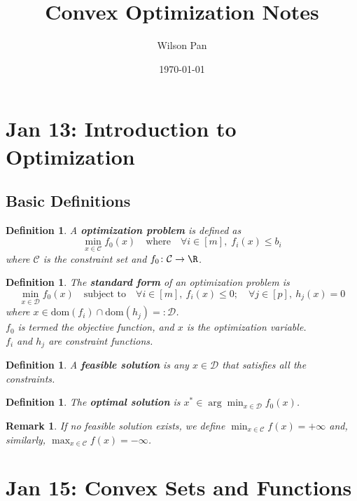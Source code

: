 \documentclass[a4paper]{article}
\title{Convex Optimization Notes}
\author{Wilson Pan}
\date{\today}
\newtheorem{defn}[thm]{Definition}
\newtheorem{rmk}[thm]{Remark}
\begin{document}
\maketitle
\tableofcontents
\newpage

\section{Jan 13: Introduction to Optimization}

\subsection{Basic Definitions}
\begin{defn}
    A \textbf{optimization problem} is defined as
    \[
        \min_{x \in \mathcal{C}} f_0(x) \quad \text{where} \quad \forall i \in [m],\; f_i(x) \leq b_i
    \]
    where $\mathcal{C}$ is the constraint set and $f_0\colon \mathcal{C} \to \R$.
\end{defn}

\begin{defn}
    The \textbf{standard form} of an optimization problem is
    \[
        \min_{x \in \mathcal{D}} f_0(x) \quad \text{subject to} \quad
        \forall i \in [m],\ f_i(x) \leq 0; \quad \forall j \in [p],\ h_j(x) = 0
    \]
    where $x \in \mathrm{dom}(f_i) \cap \mathrm{dom}(h_j) =: \mathcal{D}$.
    \\
    $f_0$ is termed the \emph{objective function}, and $x$ is the optimization variable.\\
    $f_i$ and $h_j$ are constraint functions.
\end{defn}

\begin{defn}
    A \textbf{feasible solution} is any $x \in \mathcal{D}$ that satisfies all the constraints.
\end{defn}

\begin{defn}
    The \textbf{optimal solution} is $x^* \in \arg\min_{x \in \mathcal{D}} f_0(x)$.
\end{defn}

\begin{rmk}
    If no feasible solution exists, we define $\min_{x \in \mathcal{C}} f(x) = +\infty$ and, similarly, $\max_{x \in \mathcal{C}} f(x) = -\infty$.
\end{rmk}

\newpage
\section{Jan 15: Convex Sets and Functions}
\end{document}
